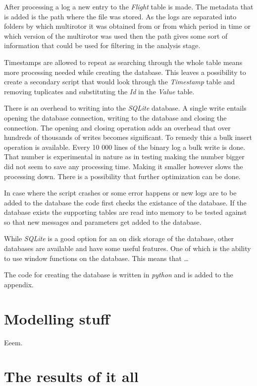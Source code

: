 \documentclass[12pt,oneside]{reedthesis}
\theoremstyle{definition}
\theoremstyle{definition}
\theoremstyle{definition}
\theoremstyle{remark}
\begin{document}
After processing a log a new entry to the \emph{Flight} table is made.
The metadata that is added is the path where the file was stored. As the
logs are separated into folders by which multirotor it was obtained from
or from which period in time or which version of the multirotor was used
then the path gives some sort of information that could be used for
filtering in the analysis stage.

Timestamps are allowed to repeat as searching through the whole table
means more processing needed while creating the database. This leaves a
possibility to create a secondary script that would look through the
\emph{Timestamp} table and removing tuplicates and substituting the
\emph{Id} in the \emph{Value} table.

There is an overhead to writing into the \emph{SQLite} database. A
single write entails opening the database connection, writing to the
database and closing the connection. The opening and closing operation
adds an overhead that over hundreds of thousands of writes becomes
significant. To remedy this a bulk insert operation is available. Every
10 000 lines of the binary log a bulk write is done. That number is
experimental in nature as in testing making the number bigger did not
seem to save any processing time. Making it smaller however slows the
processing down. There is a possibility that further optimization can be
done.

In case where the script crashes or some error happens or new logs are
to be added to the database the code first checks the existance of the
database. If the database exists the supporting tables are read into
memory to be tested against so that new messages and parameters get
added to the database.

While \emph{SQLite} is a good option for an on disk storage of the
database, other databases are available and have some useful features.
One of which is the ability to use window functions on the database.
This means that \ldots{}

The code for creating the database is written in \emph{python} and is
added to the appendix.

\chapter{Modelling stuff}\label{modelling-stuff}

Eeem.

\chapter{The results of it all}\label{the-results-of-it-all}
\end{document}
